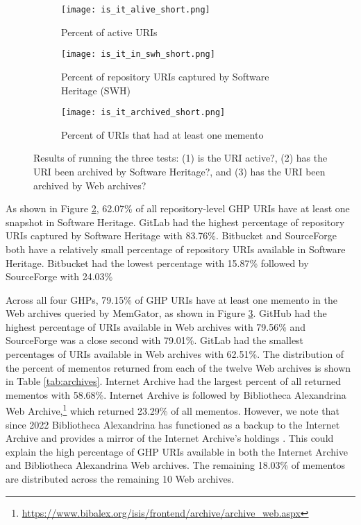 \begin{figure}
\centering
\begin{subfigure}{0.8\textwidth}
    \texttt{[image: is\_it\_alive\_short.png]}
    \caption{Percent of active URIs}
    \label{fig:alive}
\end{subfigure}
\begin{subfigure}{0.8\textwidth}
    \texttt{[image: is\_it\_in\_swh\_short.png]}
    \caption{Percent of repository URIs captured by Software Heritage (SWH)}
    \label{fig:swh}
\end{subfigure}
\begin{subfigure}{0.8\textwidth}
    \texttt{[image: is\_it\_archived\_short.png]}
    \caption{Percent of URIs that had at least one memento}
    \label{fig:timemap}
\end{subfigure}
\caption{Results of running the three tests: (1) is the URI active?, (2) has the URI been archived by Software Heritage?, and (3) has the URI been archived by Web archives?}
\label{fig:is_it}
\end{figure}

As shown in Figure \ref{fig:swh}, 62.07\% of all repository-level GHP URIs have at least one snapshot in Software Heritage. GitLab had the highest percentage of repository URIs captured by Software Heritage with 83.76\%. Bitbucket and SourceForge both have a relatively small percentage of repository URIs available in Software Heritage. Bitbucket had the lowest percentage with 15.87\% followed by SourceForge with 24.03\%

Across all four GHPs, 79.15\% of GHP URIs have at least one memento in the Web archives queried by MemGator, as shown in Figure \ref{fig:timemap}. GitHub had the highest percentage of URIs available in Web archives with 79.56\% and SourceForge was a close second with 79.01\%. GitLab had the smallest percentages of URIs available in Web archives with 62.51\%. The distribution of the percent of mementos returned from each of the twelve Web archives is shown in Table \ref{tab:archives}. Internet Archive had the largest percent of all returned mementos with 58.68\%. Internet Archive is followed by Bibliotheca Alexandrina Web Archive,\footnote{\url{https://www.bibalex.org/isis/frontend/archive/archive\_web.aspx}} which returned 23.29\% of all mementos. However, we note that since 2022 Bibliotheca Alexandrina has functioned as a backup to the Internet Archive and provides a mirror of the Internet Archive's holdings \cite{bibalex-ia}. %
This could explain the high percentage of GHP URIs available in both the Internet Archive and Bibliotheca Alexandrina Web archives. The remaining 18.03\% of mementos are distributed across the remaining 10 Web archives. 


